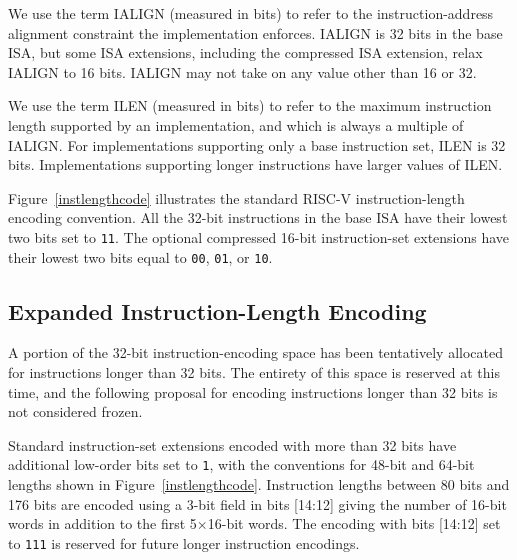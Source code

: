 We use the term IALIGN (measured in bits) to refer to the instruction-address
alignment constraint the implementation enforces.  IALIGN is 32 bits in the
base ISA, but some ISA extensions, including the compressed ISA extension,
relax IALIGN to 16 bits.  IALIGN may not take on any value other than 16 or
32.

We use the term ILEN (measured in bits) to refer to the maximum
instruction length supported by an implementation, and which is always
a multiple of IALIGN.  For implementations supporting only a base
instruction set, ILEN is 32 bits.  Implementations supporting longer
instructions have larger values of ILEN.

Figure~\ref{instlengthcode} illustrates the standard RISC-V
instruction-length encoding convention.  All the 32-bit instructions
in the base ISA have their lowest two bits set to {\tt 11}.  The
optional compressed 16-bit instruction-set extensions have their
lowest two bits equal to {\tt 00}, {\tt 01}, or {\tt 10}.

\subsection*{Expanded Instruction-Length Encoding}

A portion of the 32-bit instruction-encoding space has been tentatively
allocated for instructions longer than 32 bits.  The entirety of this space is
reserved at this time, and the following proposal for encoding instructions
longer than 32 bits is not considered frozen.

Standard instruction-set extensions
encoded with more than 32 bits have additional low-order bits set to {\tt 1},
with the conventions for 48-bit and 64-bit lengths shown in
Figure~\ref{instlengthcode}.  Instruction lengths between 80 bits and 176 bits
are encoded using a 3-bit field in bits [14:12] giving the number of 16-bit
words in addition to the first 5$\times$16-bit words.  The encoding with bits
[14:12] set to {\tt 111} is reserved for future longer instruction encodings.


